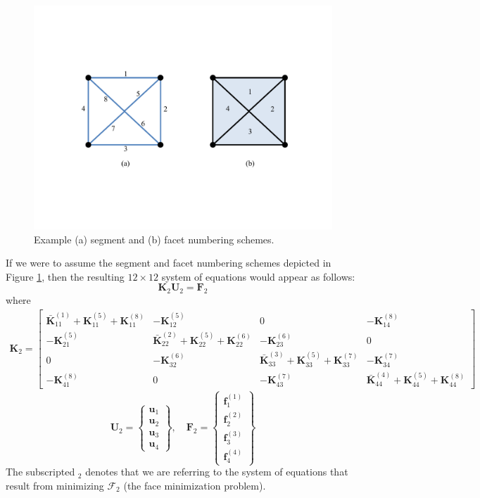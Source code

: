 \documentclass[11pt]{article} %
\begin{document}
\begin{figure} [!ht]
	\centering
	\includegraphics[width = 5in,trim=100 150 100 150,clip=true]{numbering.pdf}
	\caption{Example (a) segment and (b) facet numbering schemes.}
	\label{fig:numbering}
\end{figure}
If we were to assume the segment and facet numbering schemes depicted in Figure \ref{fig:numbering}, then the resulting $12\times12$ system of equations would appear as follows:
\begin{equation}
	\mathbf{K}_2 \mathbf{U}_2 = \mathbf{F}_2
\end{equation}
where
\begin{eqnarray}
	\mathbf{K}_2 = \left[ \begin{array}{cccc} \bar{\mathbf{K}}_{11}^{(1)}+\mathbf{K}_{11}^{(5)}+\mathbf{K}_{11}^{(8)} & -\mathbf{K}_{12}^{(5)} & 0 & -\mathbf{K}_{14}^{(8)} \\ -\mathbf{K}_{21}^{(5)} & \bar{\mathbf{K}}_{22}^{(2)}+\mathbf{K}_{22}^{(5)}+\mathbf{K}_{22}^{(6)} & -\mathbf{K}_{23}^{(6)} & 0 \\ 0 & -\mathbf{K}_{32}^{(6)} & \bar{\mathbf{K}}_{33}^{(3)}+\mathbf{K}_{33}^{(5)}+\mathbf{K}_{33}^{(7)} & -\mathbf{K}_{34}^{(7)} \\ -\mathbf{K}_{41}^{(8)} & 0 & -\mathbf{K}_{43}^{(7)} & \bar{\mathbf{K}}_{44}^{(4)}+\mathbf{K}_{44}^{(5)}+\mathbf{K}_{44}^{(8)} \end{array} \right]
\end{eqnarray}
\begin{equation}
	\mathbf{U}_2 = \left\{ \begin{array}{c} \mathbf{u}_1 \\ \mathbf{u}_2 \\ \mathbf{u}_3 \\ \mathbf{u}_4 \end{array} \right\}, \quad \mathbf{F}_2 = \left\{ \begin{array}{c} \mathbf{f}^{(1)}_1 \\ \mathbf{f}^{(2)}_2 \\ \mathbf{f}^{(3)}_3 \\ \mathbf{f}^{(4)}_4 \end{array} \right\}
\end{equation}
The subscripted $_2$ denotes that we are referring to the system of equations that result from minimizing $\mathcal{F}_2$ (the face minimization problem).
\end{document}
